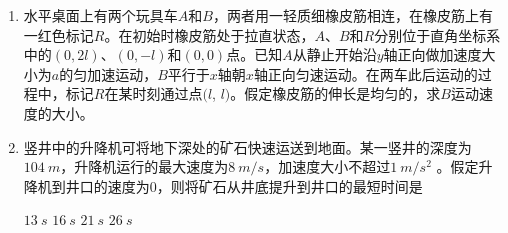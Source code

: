 \begin{enumerate}
\begin{enumerate}
\end{enumerate}
\begin{figure}[h!]
\flushright

\end{figure}






\item 
{}
水平桌面上有两个玩具车$ A $和$ B $，两者用一轻质细橡皮筋相连，在橡皮筋上有一红色标记$ R $。在初始时橡皮筋处于拉直状态，$ A $、$ B $和$ R $分别位于直角坐标系中的$ (0,2l) $、$ (0,-l) $和$ (0,0) $点。已知$ A $从静止开始沿$ y $轴正向做加速度大小为$ a $的匀加速运动，$ B $平行于$ x $轴朝$ x $轴正向匀速运动。在两车此后运动的过程中，标记$ R $在某时刻通过点$ (l $, $ l) $。假定橡皮筋的伸长是均匀的，求$ B $运动速度的大小。



\newpage	
\item 
{}
竖井中的升降机可将地下深处的矿石快速运送到地面。某一竖井的深度为$ 104 \ m $，升降机运行的最大速度为$ 8 \ m/s $，加速度大小不超过$ 1 \ m/s ^{2} $ 。假定升降机到井口的速度为$ 0 $，则将矿石从井底提升到井口的最短时间是  


\fourchoices
{$ 13 \ s $ }
{$ 16 \ s $}
{$ 21 \ s $ }
{$ 26 \ s $}


\end{enumerate}
